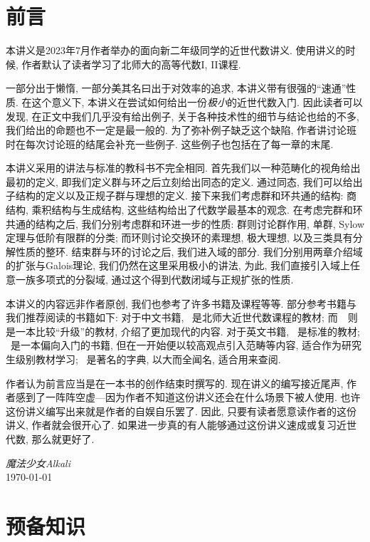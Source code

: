 \chapter{前言}

本讲义是2023年7月作者举办的面向新二年级同学的近世代数讲义.
使用讲义的时候, 作者默认了读者学习了北师大的高等代数I, II课程.

一部分出于懒惰, 一部分美其名曰出于对效率的追求, 本讲义带有很强的``速通''性质.
在这个意义下, 本讲义在尝试如何给出一份\textit{极小}的近世代数入门.
因此读者可以发现, 在正文中我们几乎没有给出例子, 关于各种技术性的细节与结论也给的不多, 我们给出的命题也不一定是最一般的.
为了弥补例子缺乏这个缺陷, 作者讲讨论班时在每次讨论班的结尾会补充一些例子.
这些例子也包括在了每一章的末尾.

本讲义采用的讲法与标准的教科书不完全相同.
首先我们以一种范畴化的视角给出最初的定义, 即我们定义群与环之后立刻给出同态的定义.
通过同态, 我们可以给出子结构的定义以及正规子群与理想的定义.
接下来我们考虑群和环共通的结构: 商结构, 乘积结构与生成结构, 这些结构给出了代数学最基本的观念.
在考虑完群和环共通的结构之后, 我们分别考虑群和环进一步的性质:
群则讨论群作用, 单群, Sylow定理与低阶有限群的分类;
而环则讨论交换环的素理想, 极大理想, 以及三类具有分解性质的整环.
结束群与环的讨论之后, 我们进入域的部分.
我们分别用两章介绍域的扩张与Galois理论, 我们仍然在这里采用极小的讲法, 为此, 我们直接引入域上任意一族多项式的分裂域, 通过这个得到代数闭域与正规扩张的性质.

本讲义的内容远非作者原创, 我们也参考了许多书籍及课程等等.
部分参考书籍与我们推荐阅读的书籍如下:
对于中文书籍, \parencite{BNU}~是北师大近世代数课程的教材; 而~\parencite{wwli}~则是一本比较``升级''的教材, 介绍了更加现代的内容.
对于英文书籍, \parencite{Hungerford}~是标准的教材;
\parencite{Chapter0}~是一本偏向入门的书籍, 但在一开始便以较高观点引入范畴等内容, 适合作为研究生级别教材学习;
\parencite{Lang}~是著名的字典, 以大而全闻名, 适合用来查阅.

作者认为前言应当是在一本书的创作结束时撰写的.
现在讲义的编写接近尾声, 作者感到了一阵阵空虚---因为作者不知道这份讲义还会在什么场景下被人使用.
也许这份讲义编写出来就是作者的自娱自乐罢了.
因此, 只要有读者愿意读作者的这份讲义, 作者就会很开心了.
如果进一步真的有人能够通过这份讲义速成或复习近世代数, 那么就更好了.

\begin{flushright}
    \textit{魔法少女Alkali}\\
    \today
\end{flushright}

\chapter{预备知识}

